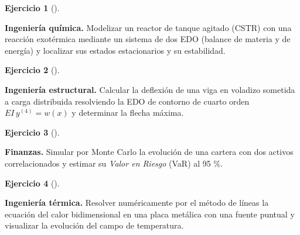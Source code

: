 \documentclass[
  spanish,
  a4paper,
]{scrreport}
\theoremstyle{definition}
\newtheorem{exercise}{Ejercicio}[chapter]
\theoremstyle{remark}
\begin{document}
\begin{exercise}[]\protect\hypertarget{exr-propuesto-reactor}{}\label{exr-propuesto-reactor}

\textbf{Ingeniería química.} Modelizar un reactor de tanque agitado
(CSTR) con una reacción exotérmica mediante un sistema de dos EDO
(balance de materia y de energía) y localizar sus estados estacionarios
y su estabilidad.

\end{exercise}

\begin{exercise}[]\protect\hypertarget{exr-propuesto-viga-carga}{}\label{exr-propuesto-viga-carga}

\textbf{Ingeniería estructural.} Calcular la deflexión de una viga en
voladizo sometida a carga distribuida resolviendo la EDO de contorno de
cuarto orden \(EI\,y^{(4)} = w(x)\) y determinar la flecha máxima.

\end{exercise}

\begin{exercise}[]\protect\hypertarget{exr-propuesto-cartera}{}\label{exr-propuesto-cartera}

\textbf{Finanzas.} Simular por Monte Carlo la evolución de una cartera
con dos activos correlacionados y estimar su \emph{Valor en Riesgo}
(VaR) al 95 \%.

\end{exercise}

\begin{exercise}[]\protect\hypertarget{exr-propuesto-difusion-calor-2d}{}\label{exr-propuesto-difusion-calor-2d}

\textbf{Ingeniería térmica.} Resolver numéricamente por el método de
líneas la ecuación del calor bidimensional en una placa metálica con una
fuente puntual y visualizar la evolución del campo de temperatura.

\end{exercise}
\end{document}
